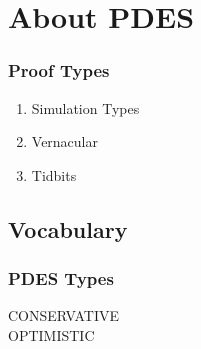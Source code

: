 % 

\section{About PDES}%
\begin{frame}\frametitle{Proof Types}
\begin{enumerate}
	\item Simulation Types
	\item Vernacular
	\item Tidbits
\end{enumerate}
\end{frame}


\subsection{Vocabulary}
\begin{frame}\frametitle{PDES Types}
	CONSERVATIVE \\
	OPTIMISTIC
\end{frame}




\endinput  %

